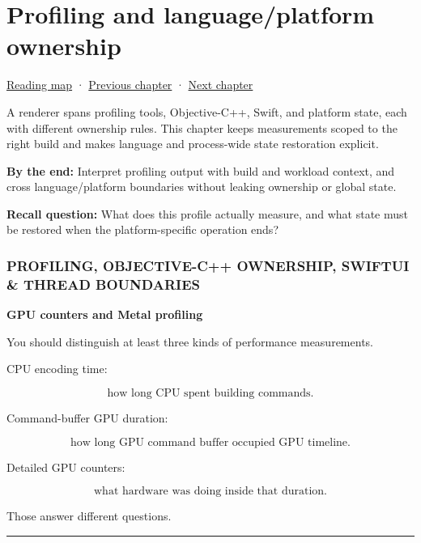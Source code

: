 \hypertarget{05-engine-i-ch024}{}
\chapter{Profiling and language/platform ownership}\label{stagechapter:05-engine-i-ch024}\label{05-engine-i-ch024-profiling-and-languageplatform-ownership}

\hyperref[volume-reading-map]{Reading map} · \hyperref[05-engine-i-ch023-execute-and-measure-a-metal-frame]{Previous chapter} · \hyperref[06-engine-ii-ch025-renderer-evolution-through-resource-ownership]{Next chapter}

A renderer spans profiling tools, Objective-C++, Swift, and platform state, each with different ownership rules. This chapter keeps measurements scoped to the right build and makes language and process-wide state restoration explicit.

\textbf{By the end:} Interpret profiling output with build and workload context, and cross language/platform boundaries without leaking ownership or global state.

\textbf{Recall question:} What does this profile actually measure, and what state must be restored when the platform-specific operation ends?

\subsection{PROFILING, OBJECTIVE-C++ OWNERSHIP, SWIFTUI \& THREAD BOUNDARIES}\label{05-engine-i-ch024-profiling-objective-c-ownership-swiftui-thread-boundaries}

\textbf{GPU counters and Metal profiling}

You should distinguish at least three kinds of performance measurements.

CPU encoding time:

\[
\text{how long CPU spent building commands}.
\]

Command-buffer GPU duration:

\[
\text{how long GPU command buffer occupied GPU timeline}.
\]

Detailed GPU counters:

\[
\text{what hardware was doing inside that duration}.
\]

Those answer different questions.

\begin{center}\rule{0.5\linewidth}{0.5pt}\end{center}


